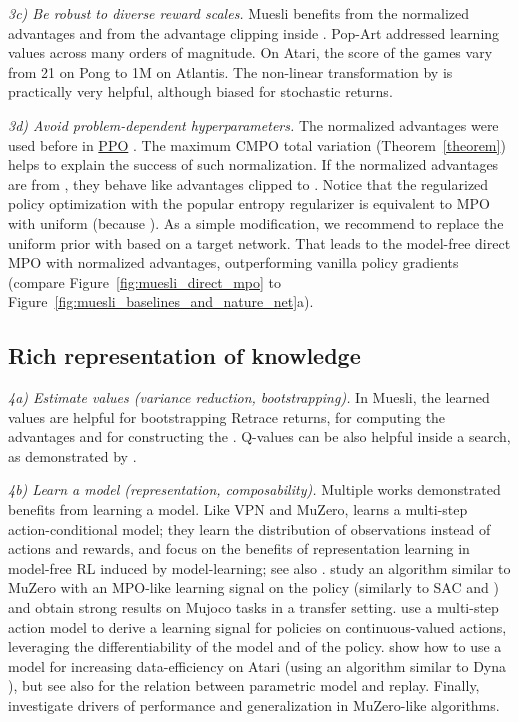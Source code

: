 \documentclass{article}
\begin{document}
\textit{3c) Be robust to diverse reward scales.} Muesli benefits from the normalized advantages and from the advantage clipping inside . Pop-Art \citep{van2016popart} addressed learning values across many orders of magnitude. On Atari, the score of the games vary from 21 on Pong to 1M on Atlantis. The non-linear transformation by \citet{Pohlen18} is practically very helpful, although biased for stochastic returns.

\textit{3d) Avoid problem-dependent hyperparameters.} The normalized advantages were used before in
\href{https://github.com/openai/baselines/blob/9b68103b737ac46bc201dfb3121cfa5df2127e53/baselines/ppo2/model.py\#L139}{PPO} \citep{schulman2017proximal}. The maximum CMPO total variation (Theorem~\ref{theorem}) helps to explain the success of such normalization. If the normalized advantages are from , they behave like advantages clipped to . Notice that the regularized policy optimization with the popular  entropy regularizer is equivalent to MPO with uniform  (because ). As a simple modification, we recommend to replace the uniform prior with  based on a target network. That leads to the model-free direct MPO with normalized advantages, outperforming vanilla policy gradients (compare Figure~\ref{fig:muesli_direct_mpo} to Figure~\ref{fig:muesli_baselines_and_nature_net}a).

\subsection{Rich representation of knowledge}

\textit{4a) Estimate values (variance reduction, bootstrapping).} In Muesli, the learned values are helpful for bootstrapping Retrace returns, for computing the advantages and for constructing the . Q-values can be also helpful inside a search, as demonstrated by \citet{Hamrick2020Combining}.

\textit{4b) Learn a model (representation, composability).}
Multiple works demonstrated benefits from learning a model.
Like VPN and MuZero, \citet{gregor2019shaping} learns a multi-step action-conditional model; they learn the distribution of observations instead of actions and rewards, and focus on the benefits of representation learning in model-free RL induced by model-learning; see also \citep{guo2018neural, guo2020bootstrap}. \citet{springenberg2020local} study an algorithm similar to MuZero with an MPO-like learning signal on the policy (similarly to SAC and \citet{jbgrill2020}) and obtain strong results on Mujoco tasks in a transfer setting.
\citet{byravan2020imagined} use a multi-step action model to derive a learning signal for policies on continuous-valued actions, leveraging the differentiability of the model and of the policy. \citet{kaiser2019model} show how to use a model for increasing data-efficiency on Atari (using an algorithm similar to Dyna \citep{sutton1990dyna}), but see also \citet{vanhasselt2019models} for the relation between parametric model and replay. Finally, \citet{hamrick2020role} investigate drivers of performance and generalization in MuZero-like algorithms.
\end{document}
